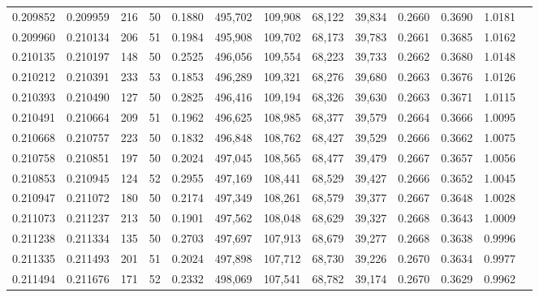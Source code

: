 \begin{tabular}{rrrrrrrrrrrrr}
0.209852 & 0.209959 &   216 &  50 &                                     0.1880 & 495,702 & 109,908 &  68,122 &  39,834 & 0.2660 & 0.3690 & 1.0181 \\
0.209960 & 0.210134 &   206 &  51 &                                     0.1984 & 495,908 & 109,702 &  68,173 &  39,783 & 0.2661 & 0.3685 & 1.0162 \\
0.210135 & 0.210197 &   148 &  50 &                                     0.2525 & 496,056 & 109,554 &  68,223 &  39,733 & 0.2662 & 0.3680 & 1.0148 \\
0.210212 & 0.210391 &   233 &  53 &                                     0.1853 & 496,289 & 109,321 &  68,276 &  39,680 & 0.2663 & 0.3676 & 1.0126 \\
0.210393 & 0.210490 &   127 &  50 &                                     0.2825 & 496,416 & 109,194 &  68,326 &  39,630 & 0.2663 & 0.3671 & 1.0115 \\
0.210491 & 0.210664 &   209 &  51 &                                     0.1962 & 496,625 & 108,985 &  68,377 &  39,579 & 0.2664 & 0.3666 & 1.0095 \\
0.210668 & 0.210757 &   223 &  50 &                                     0.1832 & 496,848 & 108,762 &  68,427 &  39,529 & 0.2666 & 0.3662 & 1.0075 \\
0.210758 & 0.210851 &   197 &  50 &                                     0.2024 & 497,045 & 108,565 &  68,477 &  39,479 & 0.2667 & 0.3657 & 1.0056 \\
0.210853 & 0.210945 &   124 &  52 &                                     0.2955 & 497,169 & 108,441 &  68,529 &  39,427 & 0.2666 & 0.3652 & 1.0045 \\
0.210947 & 0.211072 &   180 &  50 &                                     0.2174 & 497,349 & 108,261 &  68,579 &  39,377 & 0.2667 & 0.3648 & 1.0028 \\
0.211073 & 0.211237 &   213 &  50 &                                     0.1901 & 497,562 & 108,048 &  68,629 &  39,327 & 0.2668 & 0.3643 & 1.0009 \\
0.211238 & 0.211334 &   135 &  50 &                                     0.2703 & 497,697 & 107,913 &  68,679 &  39,277 & 0.2668 & 0.3638 & 0.9996 \\
0.211335 & 0.211493 &   201 &  51 &                                     0.2024 & 497,898 & 107,712 &  68,730 &  39,226 & 0.2670 & 0.3634 & 0.9977 \\
0.211494 & 0.211676 &   171 &  52 &                                     0.2332 & 498,069 & 107,541 &  68,782 &  39,174 & 0.2670 & 0.3629 & 0.9962 \\

\end{tabular}
